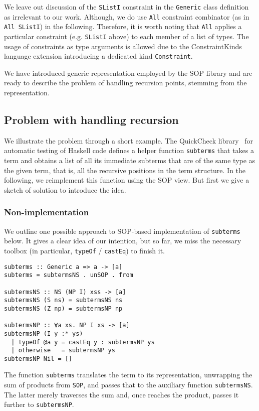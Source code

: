 \documentclass[runningheads]{llncs}
\newcommand{\K}[1]{\lstinline{#1}}
\begin{document}
We leave out discussion of the \K{SListI} constraint in the \K{Generic} class definition as irrelevant to our work. Although, we do use \K{All} constraint combinator (as in \K{All SListI}) in the following. Therefore, it is worth noting that \K{All} applies a particular constraint (e.g. \K{SListI} above) to each member of a list of types. The usage of constraints as type arguments is allowed due to the \textsf{ConstraintKinds} language extension introducing a dedicated kind \K{Constraint}.

We have introduced generic representation employed by the SOP library and are ready to describe the problem of handling recursion points, stemming from the representation. 

\subsection{Problem with handling recursion}
\label{subsec:recursion-problem}

We illustrate the problem through a short example. The \textsf{QuickCheck} library~\cite{Claessen2011} for automatic testing of Haskell code defines a helper function \K{subterms} that takes a term and obtains a list of all its immediate subterms that are of the same type as the given term, that is, all the recursive positions in the term structure. In the following, we reimplement this function using the SOP view. But first we give a sketch of solution to introduce the idea.

\subsubsection{Non-implementation}

We outline one possible approach to SOP-based implementation of \K{subterms} below. It gives a clear idea of our intention, but so far, we miss the necessary toolbox (in particular, \K{typeOf} / \K{castEq}) to finish it.
\begin{lstlisting}
subterms :: Generic a => a -> [a]
subterms = subtermsNS . unSOP . from

subtermsNS :: NS (NP I) xss -> [a]
subtermsNS (S ns) = subtermsNS ns
subtermsNS (Z np) = subtermsNP np

subtermsNP :: ∀a xs. NP I xs -> [a]
subtermsNP (I y :* ys)
  | typeOf @a y = castEq y : subtermsNP ys
  | otherwise   = subtermsNP ys
subtermsNP Nil = []
\end{lstlisting}
The function \K{subterms} translates the term to its representation, unwrapping the sum of products from \K{SOP}, and passes that to the auxiliary function \K{subtermsNS}. The latter merely traverses the sum and, once reaches the product,  passes it further to \K{subtermsNP}.
\end{document}
